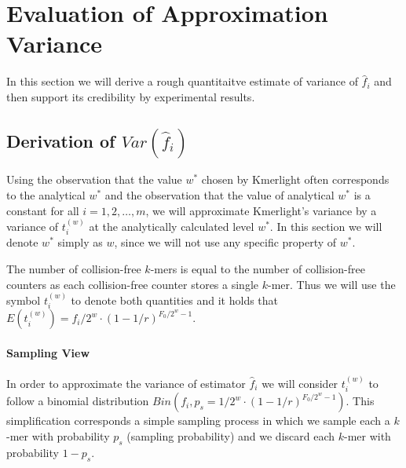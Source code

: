 \section{Evaluation of Approximation Variance}
\label{sec:estimation-variance}

In this section we will derive a rough quantitaitve estimate of variance of $ \hat f_i$
and then support its credibility by experimental results.

\subsection{Derivation of $Var(\hat f_i)$}
Using the observation that the value $w^*$ chosen by Kmerlight often corresponds
to the analytical $w^*$ and the observation that the value of analytical $w^*$ is a constant
for all $i=1, 2, \dots, m$, we will approximate Kmerlight's variance by a variance
of $t_i^{(w)}$ at the analytically calculated level $w^*$. In this section we will denote
$w^*$ simply as $w$, since we will not use any specific property of $w^*$.


The number of collision-free $k$-mers is equal to the number of collision-free counters
as each collision-free counter stores a single $k$-mer. Thus we will use the symbol
$t_i^{(w)}$ to denote both quantities and it holds that 
$E(t_i^{(w)}) = f_i/2^w \cdot (1 - 1/r)^{F_0/2^w-1}$.

% 

\paragraph{Sampling View}
In order to approximate the variance of estimator $\hat f_i$ we will consider
$t_i^{(w)}$ to follow a binomial distribution $Bin(f_i, p_s = 1/2^w \cdot (1 - 1/r)^{F_0/2^w-1})$.
This simplification corresponds a simple sampling process in which we sample each a $k$-mer
with probability $p_s$ (sampling probability) and we discard each $k$-mer
with probability $1 - p_s$.

